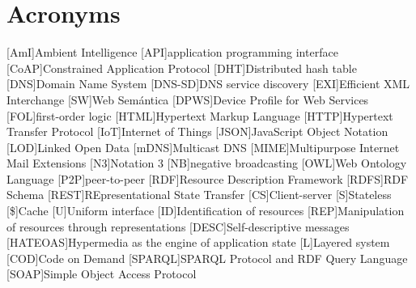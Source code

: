 


\chapter*{Acronyms}

\begin{acronym}
  [AmI]{Ambient Intelligence}
  [API]{application programming interface}
  [CoAP]{Constrained Application Protocol}
  [DHT]{Distributed hash table}
  [DNS]{Domain Name System}
  [DNS-SD]{DNS service discovery}
  [EXI]{Efficient XML Interchange}
  [SW]{Web Semántica}
  [DPWS]{Device Profile for Web Services}
  [FOL]{first-order logic}
  [HTML]{Hypertext Markup Language}
  [HTTP]{Hypertext Transfer Protocol}
  [IoT]{Internet of Things}
  [JSON]{JavaScript Object Notation}
  [LOD]{Linked Open Data}
  [mDNS]{Multicast DNS}
  [MIME]{Multipurpose Internet Mail Extensions}
  [N3]{Notation 3}
  [NB]{negative broadcasting}
  [OWL]{Web Ontology Language}
  [P2P]{peer-to-peer}
  [RDF]{Resource Description Framework}
  [RDFS]{RDF Schema}
  [REST]{REpresentational State Transfer} %
    [CS]{Client-server}
    [S]{Stateless}
    [\$]{Cache}
    [U]{Uniform interface}
    [ID]{Identification of resources}
    [REP]{Manipulation of resources through representations}
    [DESC]{Self-descriptive messages}
    [HATEOAS]{Hypermedia as the engine of application state}
    [L]{Layered system}
    [COD]{Code on Demand} %
  [SPARQL]{SPARQL Protocol and RDF Query Language}
  [SOAP]{Simple Object Access Protocol}

\end{acronym}
